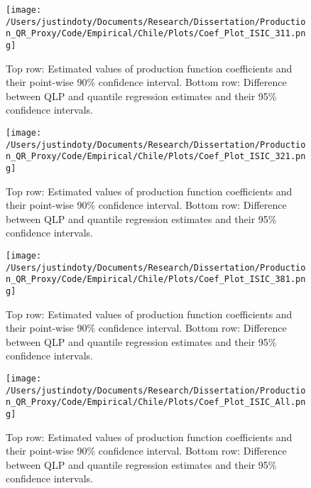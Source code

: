 \documentclass[11pt]{article}
\begin{document}
\begin{figure}[H]
\centering
\texttt{[image: /Users/justindoty/Documents/Research/Dissertation/Production\_QR\_Proxy/Code/Empirical/Chile/Plots/Coef\_Plot\_ISIC\_311.png]}
\caption{Top row: Estimated values of production function coefficients and their point-wise 90\% confidence interval. Bottom row: Difference between QLP and quantile regression estimates and their 95\% confidence intervals.}
\label{fig:CHL311}
\end{figure}

\begin{figure}[H]
\centering
\texttt{[image: /Users/justindoty/Documents/Research/Dissertation/Production\_QR\_Proxy/Code/Empirical/Chile/Plots/Coef\_Plot\_ISIC\_321.png]}
\caption{Top row: Estimated values of production function coefficients and their point-wise 90\% confidence interval. Bottom row: Difference between QLP and quantile regression estimates and their 95\% confidence intervals.}
\label{fig:CHL321}
\end{figure}

\begin{figure}[H]
\centering
\texttt{[image: /Users/justindoty/Documents/Research/Dissertation/Production\_QR\_Proxy/Code/Empirical/Chile/Plots/Coef\_Plot\_ISIC\_381.png]}
\caption{Top row: Estimated values of production function coefficients and their point-wise 90\% confidence interval. Bottom row: Difference between QLP and quantile regression estimates and their 95\% confidence intervals.}
\label{fig:CHL381}
\end{figure}

\begin{figure}[H]
\centering
\texttt{[image: /Users/justindoty/Documents/Research/Dissertation/Production\_QR\_Proxy/Code/Empirical/Chile/Plots/Coef\_Plot\_ISIC\_All.png]}
\caption{Top row: Estimated values of production function coefficients and their point-wise 90\% confidence interval. Bottom row: Difference between QLP and quantile regression estimates and their 95\% confidence intervals.}
\label{fig:CHLall}
\end{figure}


\end{document}
